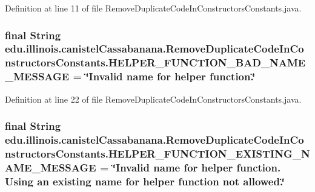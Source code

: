 Definition at line 11 of file RemoveDuplicateCodeInConstructorsConstants.java.

\hypertarget{classedu_1_1illinois_1_1canistelCassabanana_1_1RemoveDuplicateCodeInConstructorsConstants_afa4feca83076400e818b7bf986ec0cba}{
\subsubsection[{HELPER\_\-FUNCTION\_\-BAD\_\-NAME\_\-MESSAGE}]{\setlength{\rightskip}{0pt plus 5cm}final String {\bf edu.illinois.canistelCassabanana.RemoveDuplicateCodeInConstructorsConstants.HELPER\_\-FUNCTION\_\-BAD\_\-NAME\_\-MESSAGE} = \char`\"{}Invalid name for helper function.\char`\"{}}}
\label{classedu_1_1illinois_1_1canistelCassabanana_1_1RemoveDuplicateCodeInConstructorsConstants_afa4feca83076400e818b7bf986ec0cba}


Definition at line 22 of file RemoveDuplicateCodeInConstructorsConstants.java.

\hypertarget{classedu_1_1illinois_1_1canistelCassabanana_1_1RemoveDuplicateCodeInConstructorsConstants_a73f78b335cd908fb2db82107e224666a}{
\subsubsection[{HELPER\_\-FUNCTION\_\-EXISTING\_\-NAME\_\-MESSAGE}]{\setlength{\rightskip}{0pt plus 5cm}final String {\bf edu.illinois.canistelCassabanana.RemoveDuplicateCodeInConstructorsConstants.HELPER\_\-FUNCTION\_\-EXISTING\_\-NAME\_\-MESSAGE} = \char`\"{}Invalid name for helper function. Using an existing name for helper function not allowed.\char`\"{}}}
\label{classedu_1_1illinois_1_1canistelCassabanana_1_1RemoveDuplicateCodeInConstructorsConstants_a73f78b335cd908fb2db82107e224666a}


